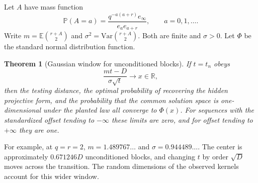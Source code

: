 \documentclass[11pt]{article}
\newtheorem{theorem}{Theorem}[section]
\newcommand{\PP}{\mathbb P}
\newcommand{\E}{\mathbb E}
\begin{document}
Let $A$ have mass function
\[
 \PP(A=a)=\frac{q^{-a(a+r)}e_\infty}{e_a e_{a+r}},\qquad a=0,1,\ldots .
\]
Write $m=\E\binom{r+A}2$ and $\sigma^2=\mathrm{Var}\binom{r+A}2$. Both are finite and $\sigma>0$. Let $\Phi$ be the standard normal distribution function.
\begin{theorem}[Gaussian window for unconditioned blocks]\label{gauss}
If $t=t_n$ obeys
\[
 \frac{mt-D}{\sigma\sqrt{t}}\longrightarrow x\in\mathbb R,
\]
then the testing distance, the optimal probability of recovering the hidden projective form, and the probability that the common solution space is one-dimensional under the planted law all converge to $\Phi(x)$. For sequences with the standardized offset tending to $-\infty$ these limits are zero, and for offset tending to $+\infty$ they are one.
\end{theorem}
For example, at $q=r=2$, $m=1.489767\ldots$ and $\sigma=0.944489\ldots$. The center is approximately $0.671246D$ unconditioned blocks, and changing $t$ by order $\sqrt D$ moves across the transition. The random dimensions of the observed kernels account for this wider window.
\end{document}
